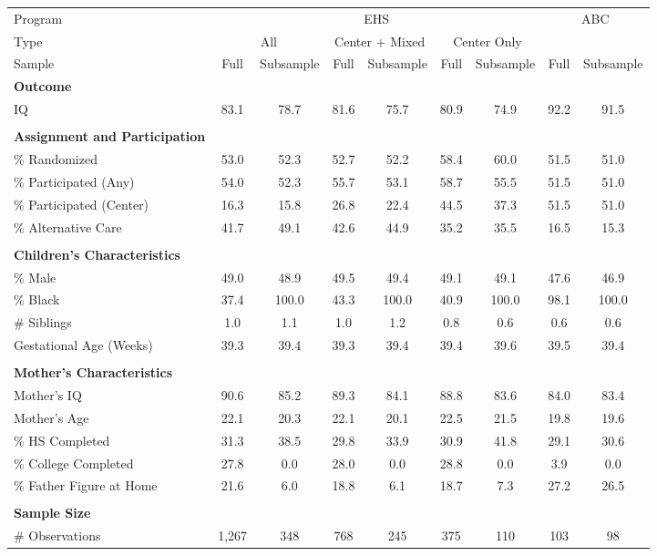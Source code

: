 \begin{tabular}{lcccccccc}
\toprule 
\midrule 
Program & \multicolumn{6}{c}{EHS} & \multicolumn{2}{c}{ABC} \\
 \cmidrule(lr){1-1} \cmidrule(lr){2-7} \cmidrule(lr){8-9} 
Type & \multicolumn{2}{c}{All} & \multicolumn{2}{c}{Center $+$ Mixed} & \multicolumn{2}{c}{Center Only} & \multicolumn{2}{c}{} \\
 \cmidrule(lr){1-1} \cmidrule(lr){2-3} \cmidrule(lr){4-5} \cmidrule(lr){6-7} \cmidrule(lr){8-9} 
Sample & Full & Subsample & Full & Subsample & Full & Subsample & Full & Subsample \\
\midrule 
\textbf{Outcome} \\
\quad IQ & 83.1 & 78.7 & 81.6 & 75.7 & 80.9 & 74.9 & 92.2 & 91.5 \\
 \\
\textbf{Assignment and Participation} \\
\quad \% Randomized & 53.0 & 52.3 & 52.7 & 52.2 & 58.4 & 60.0 & 51.5 & 51.0 \\
\quad \% Participated (Any) & 54.0 & 52.3 & 55.7 & 53.1 & 58.7 & 55.5 & 51.5 & 51.0 \\
\quad \% Participated (Center) & 16.3 & 15.8 & 26.8 & 22.4 & 44.5 & 37.3 & 51.5 & 51.0 \\
\quad \% Alternative Care & 41.7 & 49.1 & 42.6 & 44.9 & 35.2 & 35.5 & 16.5 & 15.3 \\
 \\
\textbf{Children's Characteristics} \\
\quad \% Male & 49.0 & 48.9 & 49.5 & 49.4 & 49.1 & 49.1 & 47.6 & 46.9 \\
\quad \% Black & 37.4 & 100.0 & 43.3 & 100.0 & 40.9 & 100.0 & 98.1 & 100.0 \\
\quad \# Siblings & 1.0 & 1.1 & 1.0 & 1.2 & 0.8 & 0.6 & 0.6 & 0.6 \\
\quad Gestational Age (Weeks) & 39.3 & 39.4 & 39.3 & 39.4 & 39.4 & 39.6 & 39.5 & 39.4 \\
 \\
\textbf{Mother's Characteristics} \\
\quad Mother's IQ & 90.6 & 85.2 & 89.3 & 84.1 & 88.8 & 83.6 & 84.0 & 83.4 \\
\quad Mother's Age & 22.1 & 20.3 & 22.1 & 20.1 & 22.5 & 21.5 & 19.8 & 19.6 \\
\quad \% HS Completed & 31.3 & 38.5 & 29.8 & 33.9 & 30.9 & 41.8 & 29.1 & 30.6 \\
\quad \% College Completed & 27.8 & 0.0 & 28.0 & 0.0 & 28.8 & 0.0 & 3.9 & 0.0 \\
\quad \% Father Figure at Home & 21.6 & 6.0 & 18.8 & 6.1 & 18.7 & 7.3 & 27.2 & 26.5 \\
 \\
\textbf{Sample Size} \\
\quad \# Observations & 1,267 & 348 & 768 & 245 & 375 & 110 & 103 & 98 \\
\midrule 
\bottomrule 
\end{tabular}
